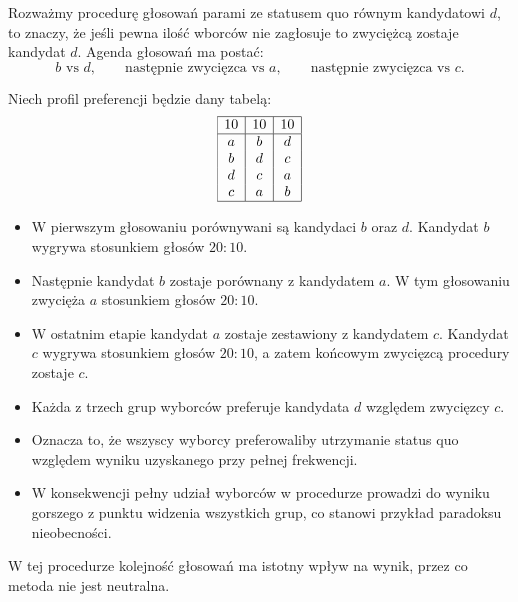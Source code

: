 \documentclass[12pt,a4paper]{mwrep}
\begin{document}
	\begin{example}
		Rozważmy procedurę głosowań parami ze statusem quo równym kandydatowi \(d\), to znaczy, że jeśli pewna ilość wborców nie zagłosuje to zwyciężcą zostaje kandydat \(d\).
		Agenda głosowań ma postać:
		\[
		b \text{ vs } d,\qquad
		\text{następnie zwycięzca vs } a,\qquad
		\text{następnie zwycięzca vs } c.
		\]
		
		Niech profil preferencji będzie dany tabelą:
		\[
		\begin{array}{|c|c|c|}
			\hline
			10 & 10 & 10\\
			\hline
			a & b & d\\
			b & d & c\\
			d & c & a\\
			c & a & b\\
			\hline
		\end{array}
		\]
		
		\begin{itemize}
			\item W pierwszym głosowaniu porównywani są kandydaci \(b\) oraz \(d\). Kandydat \(b\) wygrywa stosunkiem głosów \(20:10\).
			
			\item Następnie kandydat \(b\) zostaje porównany z kandydatem \(a\). W tym głosowaniu zwycięża \(a\) stosunkiem głosów \(20:10\).
			
			\item W ostatnim etapie kandydat \(a\) zostaje zestawiony z kandydatem \(c\). Kandydat \(c\) wygrywa stosunkiem głosów \(20:10\), a zatem końcowym zwycięzcą procedury zostaje \(c\).
			
			\item Każda z trzech grup wyborców preferuje kandydata \(d\) względem zwycięzcy \(c\).
			
			\item Oznacza to, że wszyscy wyborcy preferowaliby utrzymanie status quo względem wyniku uzyskanego przy pełnej frekwencji.
			
			\item W konsekwencji pełny udział wyborców w procedurze prowadzi do wyniku gorszego z punktu widzenia wszystkich grup, co stanowi przykład paradoksu nieobecności.
		\end{itemize}
	\end{example}
	
	W tej procedurze kolejność głosowań ma istotny wpływ na wynik, przez co metoda nie jest neutralna.
	
\end{document}
